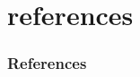 %
%
%

\section{references}
\begin{frame}[allowframebreaks,t]
  \frametitle{References}
  
  {\footnotesize }
\end{frame}

